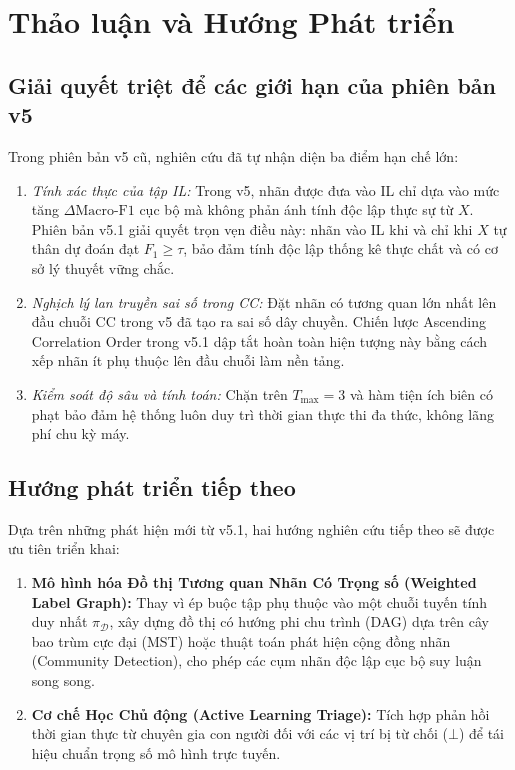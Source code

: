 \documentclass[11pt,a4paper]{article}
\begin{document}
\section{Thảo luận và Hướng Phát triển}
\label{sec:discussion}

\subsection{Giải quyết triệt để các giới hạn của phiên bản v5}
Trong phiên bản v5 cũ, nghiên cứu đã tự nhận diện ba điểm hạn chế lớn:
\begin{enumerate}
    \item \textit{Tính xác thực của tập IL:} Trong v5, nhãn được đưa vào IL chỉ dựa vào mức tăng $\Delta\text{Macro-F1}$ cục bộ mà không phản ánh tính độc lập thực sự từ $X$. Phiên bản v5.1 giải quyết trọn vẹn điều này: nhãn vào IL khi và chỉ khi $X$ tự thân dự đoán đạt $F_1 \ge \tau$, bảo đảm tính độc lập thống kê thực chất và có cơ sở lý thuyết vững chắc.
    \item \textit{Nghịch lý lan truyền sai số trong CC:} Đặt nhãn có tương quan lớn nhất lên đầu chuỗi CC trong v5 đã tạo ra sai số dây chuyền. Chiến lược Ascending Correlation Order trong v5.1 dập tắt hoàn toàn hiện tượng này bằng cách xếp nhãn ít phụ thuộc lên đầu chuỗi làm nền tảng.
    \item \textit{Kiểm soát độ sâu và tính toán:} Chặn trên $T_{\max} = 3$ và hàm tiện ích biên có phạt bảo đảm hệ thống luôn duy trì thời gian thực thi đa thức, không lãng phí chu kỳ máy.
\end{enumerate}

\subsection{Hướng phát triển tiếp theo}
Dựa trên những phát hiện mới từ v5.1, hai hướng nghiên cứu tiếp theo sẽ được ưu tiên triển khai:
\begin{enumerate}
    \item \textbf{Mô hình hóa Đồ thị Tương quan Nhãn Có Trọng số (Weighted Label Graph):} Thay vì ép buộc tập phụ thuộc vào một chuỗi tuyến tính duy nhất $\pi_{\mathcal{D}}$, xây dựng đồ thị có hướng phi chu trình (DAG) dựa trên cây bao trùm cực đại (MST) hoặc thuật toán phát hiện cộng đồng nhãn (Community Detection), cho phép các cụm nhãn độc lập cục bộ suy luận song song.
    \item \textbf{Cơ chế Học Chủ động (Active Learning Triage):} Tích hợp phản hồi thời gian thực từ chuyên gia con người đối với các vị trí bị từ chối ($\bot$) để tái hiệu chuẩn trọng số mô hình trực tuyến.
\end{enumerate}
\end{document}

